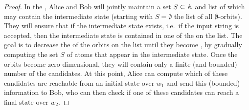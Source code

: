 \begin{proof}
In the , Alice and Bob will jointly maintain a set
$S \subseteq \mathbb A$ and list of  which may contain the
intermediate state (starting with $S = \emptyset$ the list of all
$\emptyset$-orbits). They will ensure that if the intermediate state exists,
i.e.~if the input string is accepted,  then the intermediate state is contained
in one of the  on the list. The goal is to decrease the  of the orbits on the list until they become
, by gradually computing the set $S$ of atoms that appear in
the intermediate state. Once the orbits become zero-dimensional, they will
contain only a finite (and bounded) number of the candidates. At this point,
Alice can compute which of these candidates are reachable from an initial state
over $w_1$ and send this (bounded) information to Bob, who can then check if
one of these candidates can reach a final state over $w_2$. 


\end{proof}
